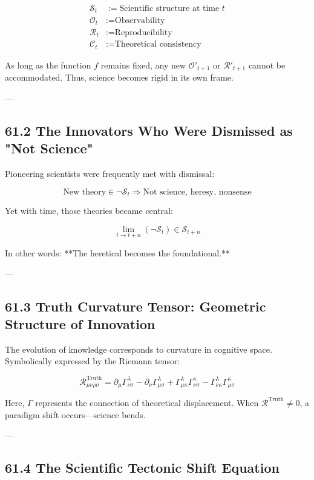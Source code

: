 \documentclass[12pt]{article}
\begin{document}
\begin{enumerate}
\begin{align*}
\mathcal{S}_{t} &:= \text{Scientific structure at time } t \\
\mathcal{O}_{t} &:= \text{Observability} \\
\mathcal{R}_{t} &:= \text{Reproducibility} \\
\mathcal{C}_{t} &:= \text{Theoretical consistency}
\end{align*}

As long as the function $f$ remains fixed,  
any new $\mathcal{O}'_{t+1}$ or $\mathcal{R}'_{t+1}$ cannot be accommodated.  
Thus, science becomes rigid in its own frame.

---

\subsection*{61.2 The Innovators Who Were Dismissed as "Not Science"}

Pioneering scientists were frequently met with dismissal:

\[
\text{New theory} \in \neg \mathcal{S}_{t} \Rightarrow \text{Not science, heresy, nonsense}
\]

Yet with time, those theories became central:

\[
\lim_{t \to t+n} \left( \neg \mathcal{S}_{t} \right) \in \mathcal{S}_{t+n}
\]

In other words:  
**The heretical becomes the foundational.**

---

\subsection*{61.3 Truth Curvature Tensor: Geometric Structure of Innovation}

The evolution of knowledge corresponds to curvature in cognitive space.  
Symbolically expressed by the Riemann tensor:

\[
\mathcal{R}_{\mu\nu\rho\sigma}^{\text{Truth}} = \partial_\mu \Gamma^\lambda_{\nu\sigma} - \partial_\nu \Gamma^\lambda_{\mu\sigma} + \Gamma^\lambda_{\mu\kappa} \Gamma^\kappa_{\nu\sigma} - \Gamma^\lambda_{\nu\kappa} \Gamma^\kappa_{\mu\sigma}
\]

Here, $\Gamma$ represents the connection of theoretical displacement.  
When $\mathcal{R}^{\text{Truth}} \neq 0$, a paradigm shift occurs—science bends.

---

\subsection*{61.4 The Scientific Tectonic Shift Equation}


\end{enumerate}
\end{document}
